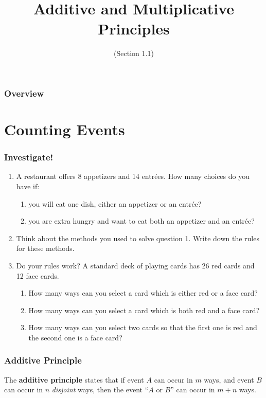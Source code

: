 \documentclass[11pt, compress]{beamer}
\title{Additive and Multiplicative Principles}
\subtitle{(Section 1.1)}
\author{}
\date[]{}
\newcommand{\terminology}[1]{\textbf{#1}}
\begin{document}
\begin{frame}
\maketitle 
\end{frame}
 
\begin{frame}
\frametitle{Overview}
\tableofcontents 
\end{frame}
 

\section{Counting Events}
\begin{frame}
\frametitle{Investigate!}
 \begin{enumerate}
\item{} A restaurant offers 8 appetizers and 14 entrées. How many choices do you have if:\begin{enumerate}
\item{} you will eat one dish, either an appetizer or an entrée?

\item{} you are extra hungry and want to eat both an appetizer and an entrée?
\end{enumerate}



\item{} Think about the methods you used to solve question 1. Write down the rules for these methods.


\item{} Do your rules work? A standard deck of playing cards has 26 red cards and 12 face cards.\begin{enumerate}
\item{} How many ways can you select a card which is either red or a face card?

\item{} How many ways can you select a card which is both red and a face card?

\item{} How many ways can you select two cards so that the first one is red and the second one is a face card?
\end{enumerate}


\end{enumerate}

\end{frame}
 
\begin{frame}
\frametitle{Additive Principle}
 The \terminology{additive principle}  states that if event \(A\) can occur in \(m\) ways, and event \(B\) can occur in \(n\) \emph{disjoint} ways, then the event ``\(A\) or \(B\)'' can occur in \(m + n\) ways.
\end{frame}
 
\end{document}
